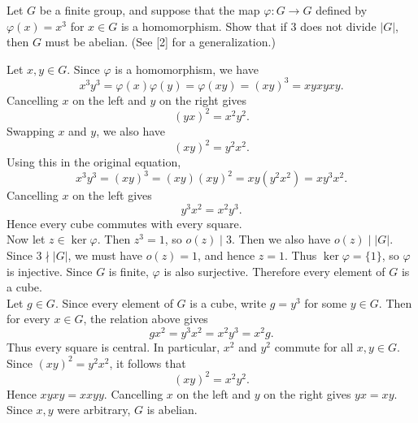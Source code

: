 \documentclass[../Odyssey_Project.tex]{subfiles}
\begin{document}
\begin{exercise}
\label{ex:1.3}
Let $G$ be a finite group, and suppose that the map $\varphi : G \to G$ defined by $\varphi(x) = x^3$ for $x \in G$ is a homomorphism. Show that if 3 does not divide $|G|$, then $G$ must be abelian. (See [2] for a generalization.)
\end{exercise}
\begin{solution}
Let \(x,y \in G\). Since \(\varphi\) is a homomorphism, we have
\[
    x^3y^3 = \varphi(x)\varphi(y) = \varphi(xy) = (xy)^3 = xyxyxy.
\]
Cancelling \(x\) on the left and \(y\) on the right gives
\[
    (yx)^2 = x^2y^2.
\]
Swapping \(x\) and \(y\), we also have
\[
    (xy)^2 = y^2x^2.
\]
Using this in the original equation,
\[
    x^3y^3 = (xy)^3 = (xy)(xy)^2 = xy(y^2x^2) = xy^3x^2.
\]
Cancelling \(x\) on the left gives
\[
    y^3x^2 = x^2y^3.
\]
Hence every cube commutes with every square. \\
Now let \(z \in \ker \varphi\). Then \(z^3 = 1\), so \(o(z) \mid 3\). Then we also have \(o(z) \mid |G|\). Since \(3 \nmid |G|\), we must have \(o(z) = 1\), and hence \(z = 1\). Thus \(\ker \varphi = \{1\}\), so \(\varphi\) is injective. Since \(G\) is finite, \(\varphi\) is also surjective. Therefore every element of \(G\) is a cube. \\
Let \(g \in G\). Since every element of \(G\) is a cube, write \(g = y^3\) for some \(y \in G\). Then for every \(x \in G\), the relation above gives
\[
    gx^2 = y^3x^2 = x^2y^3 = x^2g.
\]
Thus every square is central. In particular, \(x^2\) and \(y^2\) commute for all \(x,y \in G\). Since \((xy)^2 = y^2x^2\), it follows that
\[
    (xy)^2 = x^2y^2.
\]
Hence \(xyxy = xxyy\). Cancelling \(x\) on the left and \(y\) on the right gives \(yx = xy\). Since \(x,y\) were arbitrary, \(G\) is abelian.
\end{solution}
\end{document}
